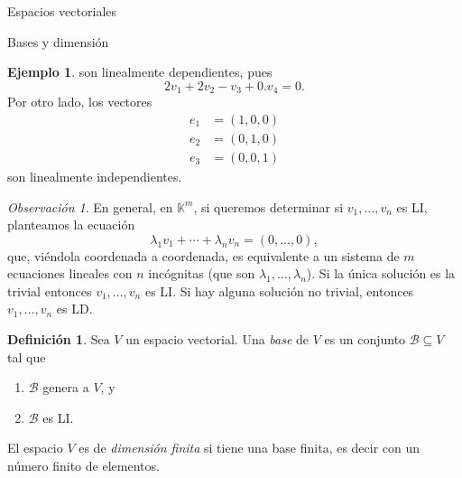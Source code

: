 \documentclass[a4paper,12pt,twoside,spanish,reqno]{amsbook}
\theoremstyle{definition}
\newtheorem{definicion}{Definici\'on}[section]
\newtheorem{ejemplo}{Ejemplo}[section]
\theoremstyle{remark}
\newtheorem{observacion}{Observaci\'on}[section]
\newcommand{\K}{\mathbb K}
\begin{document}
\begin{chapter}{Espacios vectoriales}
\begin{section}{Bases y dimensión}
\begin{ejemplo}
	son linealmente dependientes, pues
	$$
	2v_1+2v_2 -v_3 +0.v_4 =0.
	$$
	Por otro lado, los vectores
	\begin{align*}
	e_1 &= (1,0,0) \\
	e_2 &= (0,1,0) \\
	e_3 &= (0,0,1) 
	\end{align*}
	son linealmente independientes.
\end{ejemplo}


\begin{observacion}
	En  general,  en $\K^m$, si queremos determinar si  $v_1,\ldots,v_n$ es LI, planteamos la ecuación  
	\begin{equation*}
	\lambda_1v_1+\cdots+\lambda_nv_n=(0,\ldots,0),
	\end{equation*}
	que, viéndola coordenada a coordenada, es equivalente a un sistema de $m$ ecuaciones lineales con  $n$ incógnitas (que son $\lambda_1,\ldots,\lambda_n$). Si  la única solución es la trivial entonces $v_1,\ldots,v_n$ es LI. Si hay alguna solución no trivial, entonces $v_1,\ldots,v_n$ es LD. 
\end{observacion}
 
 \begin{definicion}
 	Sea $V$ un espacio vectorial. Una \textit{base} de $V$ es un conjunto $\mathcal B \subseteq V$ tal que
 	\begin{enumerate}
 		\item $\mathcal B$ genera a $V$, y
 		\item $\mathcal B$ es LI.
 	\end{enumerate}
 	 El espacio $V$ es de \textit{dimensión finita} si tiene una base finita,  es decir con  un número finito de elementos.
 \end{definicion}




\end{section}
\end{chapter}
\end{document}

